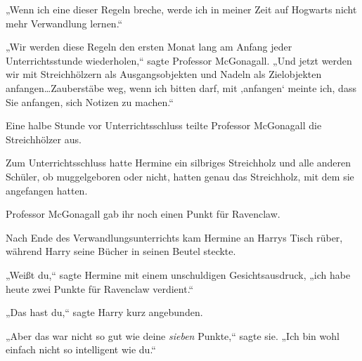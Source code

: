 „Wenn ich eine dieser Regeln breche, werde ich in meiner Zeit auf Hogwarts nicht mehr Verwandlung lernen.“

„Wir werden diese Regeln den ersten Monat lang am Anfang jeder Unterrichtsstunde wiederholen,“ sagte Professor McGonagall. „Und jetzt werden wir mit Streichhölzern als Ausgangsobjekten und Nadeln als Zielobjekten anfangen…Zauberstäbe weg, wenn ich bitten darf, mit ‚anfangen‘ meinte ich, dass Sie anfangen, sich Notizen zu machen.“

Eine halbe Stunde vor Unterrichtsschluss teilte Professor McGonagall die Streichhölzer aus.

Zum Unterrichtsschluss hatte Hermine ein silbriges Streichholz und alle anderen Schüler, ob muggelgeboren oder nicht, hatten genau das Streichholz, mit dem sie angefangen hatten.

Professor McGonagall gab ihr noch einen Punkt für Ravenclaw.

\later

Nach Ende des Verwandlungsunterrichts kam Hermine an Harrys Tisch rüber, während Harry seine Bücher in seinen Beutel steckte.

„Weißt du,“ sagte Hermine mit einem unschuldigen Gesichtsausdruck, „ich habe heute zwei Punkte für Ravenclaw verdient.“

„Das hast du,“ sagte Harry kurz angebunden.

„Aber das war nicht so gut wie deine \emph{sieben} Punkte,“ sagte sie. „Ich bin wohl einfach nicht so intelligent wie du.“

